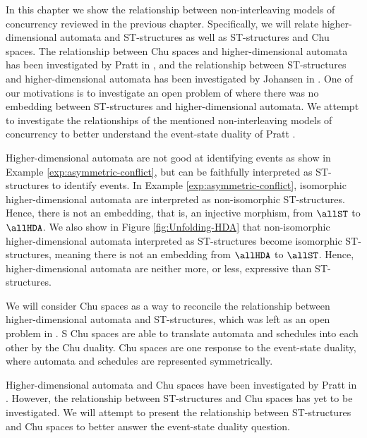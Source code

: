 In this chapter we show the relationship between non-interleaving models of concurrency reviewed in the previous chapter. Specifically, we will relate higher-dimensional automata and ST-structures as well as ST-structures and Chu spaces. The relationship between Chu spaces and higher-dimensional automata has been investigated by Pratt in \cite{Pratt02eventStateDuality}, and the relationship between ST-structures and higher-dimensional automata has been investigated by Johansen in \cite{Johansen16STstruct}. One of our motivations is to investigate an open problem of \cite{Johansen16STstruct} where there was no embedding between ST-structures and higher-dimensional automata. We attempt to investigate the relationships of the mentioned non-interleaving models of concurrency to better understand the event-state duality of Pratt \cite{Pratt02eventStateDuality}.

Higher-dimensional automata are not good at identifying events as show in Example \ref{exp:asymmetric-conflict}, but can be faithfully interpreted as ST-structures to identify events. In Example \ref{exp:asymmetric-conflict}, isomorphic higher-dimensional automata are interpreted as non-isomorphic ST-structures. Hence, there is not an embedding, that is, an injective morphism, from $\allST$ to $\allHDA$. We also show in Figure \ref{fig:Unfolding-HDA} that non-isomorphic higher-dimensional automata interpreted as ST-structures become isomorphic ST-structures, meaning there is not an embedding from $\allHDA$ to $\allST$. Hence, higher-dimensional automata are neither more, or less, expressive than ST-structures.

We will consider Chu spaces as a way to reconcile the relationship between higher-dimensional automata and ST-structures, which was left as an open problem in \cite{Johansen16STstruct}. S Chu spaces are able to translate automata and schedules into each other by the Chu duality. Chu spaces are one response to the event-state duality, where automata and schedules are represented symmetrically. 


Higher-dimensional automata and Chu spaces have been investigated by Pratt in \cite{Pratt02eventStateDuality}. However, the relationship between ST-structures and Chu spaces has yet to be investigated. We will attempt to present the relationship between ST-structures and Chu spaces to better answer the event-state duality question.

